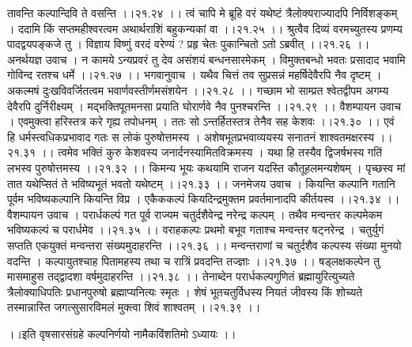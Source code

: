 \documentclass[11pt]{book}
\begin{document}
\begin{landscape}
तावन्ति कल्पान्दिवि ते वसन्ति ।।२१.२४ ।।
त्वं चापि मे ब्रूहि वरं यथेष्टं
त्रैलोक्यराज्यादपि निर्विशङ्कम् ।
ददामि किं सप्तमहीश्वरत्वम
अथार्थराशिं बहुकन्यकां वा ।।२१.२५ ।।
श्रुत्वैव दिव्यं वरमच्युतस्य
प्रणम्य पादद्वयपङ्कजे तु ।
विज्ञाय विष्णुं वरदं वरेण्यं
? प्रहृ चेतः पुकान्चितो ऽतो ऽब्रवीत् ।।२१.२६ ।।
अनर्थयज्ञ उवाच ।
न कामये ऽन्यप्रवरं तु देव
असंशयं बन्धनसारमेकम् ।
विमुक्तबन्धो भवतः प्रसादाद
भवामि गोविन्द रतश्च धर्मे ।।२१.२७ ।।
भगवानुवाच ।
यथैव चित्तं तव सुप्रसन्नं
महर्षिदेवैरपि नैव दृष्टम् ।
अकल्मषं दुःखविवर्जितत्वम
भवार्णवस्तीर्णमसंशयेन ।।२१.२८ ।।
गच्छाम भो साम्प्रत श्वेतद्वीपम
अगम्य देवैरपि दुर्निरीक्ष्यम् ।
मद्भक्तिपूतमनसा प्रयाति
घोरार्णवे नैव पुनश्चरन्ति ।।२१.२९ ।।
वैशम्पायन उवाच ।
एवमुक्त्वा हरिस्तत्र करे गृह्य तपोधनम् ।
ततः सो ऽन्तर्हितस्तत्र तेनैव सह केशवः ।।२१.३० ।।
एवं हि धर्मस्त्वधिकप्रभावाद
गतः स लोकं पुरुषोत्तमस्य ।
अशेषभूतप्रभवाव्ययस्य
सनातनं शाश्वतमक्षरस्य ।।२१.३१ ।।
त्वमेव भक्तिं कुरु केशवस्य
जनार्दनस्यामितविक्रमस्य ।
यथा हि तस्यैव द्विजर्षभस्य
गतिं लभस्व पुरुषोत्तमस्य ।।२१.३२ ।।
किमन्य भूयः कथयामि राजन
यदस्ति कौतूहलमन्यशेषम् ।
पृच्छस्व मां तात यथेप्सितं ते
भविष्यभूतं भवतो यथेष्टम् ।।२१.३३ ।।
जनमेजय उवाच ।
कियन्ति कल्पानि गतानि पूर्वम
भविष्यकल्पानि कियन्ति विप्र ।
एकैककल्पं कियदिन्द्रमुक्तम
प्रवर्तमानादपि कीर्तयस्व ।।२१.३४ ।।
वैशम्पायन उवाच ।
परार्धकल्पं गत पूर्व राज्यम
चतुर्दशैवेन्द्र नरेन्द्र कल्पम् ।
तथैव मन्वन्तर कल्पमेकम
भविष्यकल्पं च परार्धमेव ।।२१.३५ ।।
वराहकल्पः प्रथमो बभूव
गताश्च मन्वन्तर षट्नरेन्द्र ।
चतुर्युगं सप्तति एकयुक्तं
मन्वन्तरा संख्यमुदाहरन्ति ।।२१.३६ ।।
मन्वन्तराणां च चतुर्दशैव
कल्पस्य संख्या मुनयो वदन्ति ।
कल्पायुतश्चाह पितामहस्य
तथा च रात्रिं प्रवदन्ति तज्ज्ञाः ।।२१.३७ ।।
षड्लक्षकल्पेन तु मासमाहुस
तद्द्वादशा वर्षमुदाहरन्ति ।।२१.३८ ।।
तेनाब्देन परार्धकल्पगुणितं ब्रह्मायुरित्युच्यते
त्रैलोक्याधिपतिः प्रधानपुरुषो ब्रह्माप्यनित्यः स्मृतः ।
शेषं भूतचतुर्विधस्य नियतं जीवस्य किं शोच्यते
तस्मान्नास्ति जगत्सुसारविमलं मुक्त्वा शिवं शाश्वतम् ।।२१.३९ ।।

 ।।इति वृषसारसंग्रहे कल्पनिर्णयो नामैकविंशतिमो ऽध्यायः ।।





\end{landscape}
\end{document}
